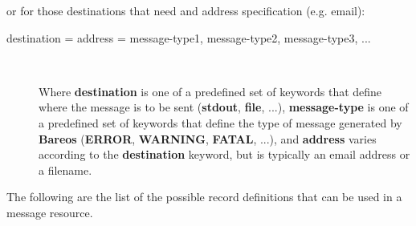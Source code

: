 or for those destinations that need and address specification (e.g. email):

\begin{description}

\item [destination = address = message-type1, message-type2, message-type3, ...] \hfill \\

Where {\bf destination} is one of a predefined set of keywords that define
where the message is to be sent ({\bf stdout}, {\bf file}, ...), {\bf
message-type} is one of a predefined set of keywords that define the type of
message generated by {\bf Bareos} ({\bf ERROR}, {\bf WARNING}, {\bf FATAL},
...), and {\bf address} varies according to the {\bf destination} keyword, but
is typically an email address or a filename.
\end{description}

The following are the list of the possible record definitions that can be used
in a message resource.



